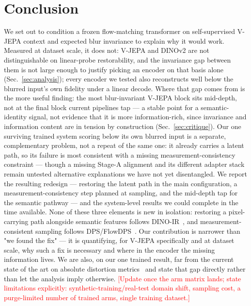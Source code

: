 \documentclass{article}
\newcommand{\authnote}[1]{\textcolor{red}{\footnotesize [#1]}}
\begin{document}
\section{Conclusion}
\label{sec:conclusion}
We set out to condition a frozen flow-matching transformer on self-supervised V-JEPA context and expected blur invariance to explain why it would work. Measured at dataset scale, it does not: V-JEPA and DINOv2 are not distinguishable on linear-probe restorability, and the invariance gap between them is not large enough to justify picking an encoder on that basis alone (Sec.~\ref{sec:analysis}); every encoder we tested also reconstructs well below the blurred input's own fidelity under a linear decode. Where that gap comes from is the more useful finding: the most blur-invariant V-JEPA block sits mid-depth, not at the final block current pipelines tap — a stable point for a semantic-identity signal, not evidence that it is more information-rich, since invariance and information content are in tension by construction (Sec.~\ref{sec:critique}). Our one surviving trained system scoring below its own blurred input is a separate, complementary problem, not a repeat of the same one: it already carries a latent path, so its failure is most consistent with a missing measurement-consistency constraint — though a missing Stage-A alignment and its different adapter stack remain untested alternative explanations we have not yet disentangled. We report the resulting redesign — restoring the latent path in the main configuration, a measurement-consistency step planned at sampling, and the mid-depth tap for the semantic pathway — and the system-level results we could complete in the time available. None of these three elements is new in isolation: restoring a pixel-carrying path alongside semantic features follows DINO-IR~\cite{dinoir2024}, and measurement-consistent sampling follows DPS/FlowDPS~\cite{chung2023diffusion,flowdps2025}. Our contribution is narrower than "we found the fix" — it is quantifying, for V-JEPA specifically and at dataset scale, why such a fix is necessary and where in the encoder the missing information lives. We are also, on our one trained result, far from the current state of the art on absolute distortion metrics~\cite{deblurflow2026} and state that gap directly rather than let the analysis imply otherwise. \authnote{Update once the arm matrix lands; state limitations explicitly: synthetic-training/real-test domain shift, sampling cost, a purge-limited number of trained arms, single training dataset.}
\end{document}
